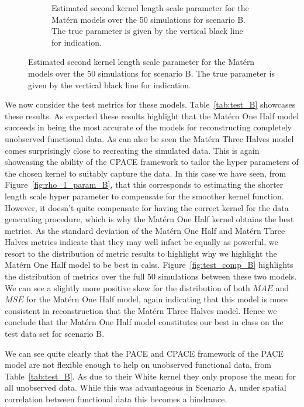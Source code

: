 \begin{figure}
\begin{subfigure}[b]{0.45\textwidth}
		\caption{Estimated second kernel length scale parameter for the Mat\'ern models over the 50 simulations for scenario B. The true parameter is given by the vertical black line for indication.}
		\label{fig:rho_2_param_B}
	\end{subfigure}
\end{figure}

We now consider the test metrics for these models.
Table~\ref{tab:test_B} showcases these results.
As expected these results highlight that the Mat\'ern One Half model succeeds in being the most accurate of the models for reconstructing completely unobserved functional data.
As can also be seen the Mat\'ern Three Halves model comes surprisingly close to recreating the simulated data.
This is again showcasing the ability of the CPACE framework to tailor the hyper parameters of the chosen kernel to suitably capture the data.
In this case we have seen, from Figure~\ref{fig:rho_1_param_B}, that this corresponds to estimating the shorter length scale hyper parameter to compensate for the smoother kernel function.
However, it doesn't quite compensate for having the correct kernel for the data generating procedure, which is why the Mat\'ern One Half kernel obtains the best metrics.
As the standard deviation of the Mat\'ern One Half and Mat\'ern Three Halves metrics indicate that they may well infact be equally as powerful, we resort to the distribution of metric results to highlight why we highlight the Mat\'ern One Half model to be best in calss.
Figure~\ref{fig:test_comp_B} highlights the distribution of metrics over the full 50 simulations between these two models.
We can see a slightly more positive skew for the distribution of both $MAE$ and $MSE$ for the Mat\'ern One Half model, again indicating that this model is more consistent in reconstruction that the Mat\'ern Three Halves model.
Hence we conclude that the Mat\'ern One Half model constitutes our best in class on the test data set for scenario B. 

We can see quite clearly that the PACE and CPACE framework of the PACE model are not flexible enough to help on unobserved functional data, from Table~\ref{tab:test_B}.
As due to their White kernel they only propose the mean for all unobserved data.
While this was advantageous in Scenario A, under spatial correlation between functional data this becomes a hindrance. 

